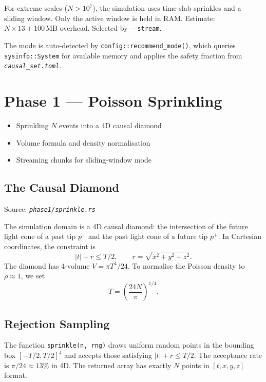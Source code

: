 \documentclass[11pt, a4paper, openany]{book}
\newcommand{\func}[1]{\texttt{\color{structure}#1}}
\newcommand{\flag}[1]{\texttt{-{}-#1}}
\newcommand{\file}[1]{\texttt{\itshape #1}}
\newenvironment{introduction}[1][Chapter Overview]{%
  \begin{tcolorbox}[
    enhanced,colback=structure!5,colframe=structure,
    colbacktitle=structure,coltitle=white,
    fonttitle=\small\bfseries,title={#1},
    arc=2pt,boxrule=0.7pt,
    left=8pt,right=8pt,top=6pt,bottom=6pt,
    before skip=12pt,after skip=12pt
  ]\itshape\begin{itemize}[leftmargin=*,itemsep=2pt,parsep=0pt]
}{%
  \end{itemize}\end{tcolorbox}
}
\begin{document}
\begin{definition}
  For extreme scales ($N > 10^7$), the simulation uses time-slab sprinkles and a
  sliding window.  Only the active window is held in RAM.  Estimate:
  $N \times 13 + 100\,\text{MB}$ overhead.  Selected by \flag{stream}.
\end{definition}

The mode is auto-detected by \func{config::recommend\_mode()}, which queries
\func{sysinfo::System} for available memory and applies the safety fraction
from \file{causal\_set.toml}.


\chapter{Phase 1 --- Poisson Sprinkling}

\begin{introduction}
  \item Sprinkling $N$ events into a 4D causal diamond
  \item Volume formula and density normalisation
  \item Streaming chunks for sliding-window mode
\end{introduction}

\section{The Causal Diamond}

Source: \file{phase1/sprinkle.rs}

The simulation domain is a 4D causal diamond: the intersection of the future
light cone of a past tip $p^-$ and the past light cone of a future tip $p^+$.
In Cartesian coordinates, the constraint is
\[
  |t| + r \leq T/2, \qquad r = \sqrt{x^2 + y^2 + z^2}.
\]
The diamond has 4-volume $V = \pi T^4 / 24$.  To normalise the Poisson density
to $\rho \approx 1$, we set
\[
  T = \left(\frac{24N}{\pi}\right)^{1/4}.
\]

\section{Rejection Sampling}

The function \func{sprinkle(n, rng)} draws uniform random points in the bounding
box $[-T/2, T/2]^4$ and accepts those satisfying $|t| + r \leq T/2$.  The
acceptance rate is $\pi/24 \approx 13\%$ in 4D.  The returned array has exactly
$N$ points in $[t, x, y, z]$ format.
\end{document}
